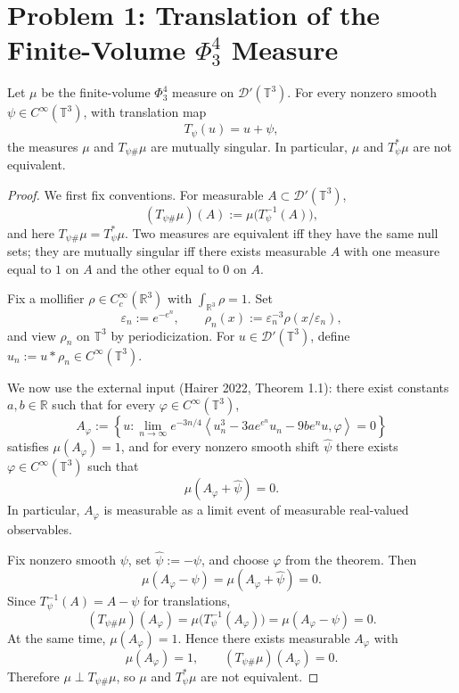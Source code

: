 \section{Problem 1: Translation of the Finite-Volume $\Phi^4_3$ Measure}\label{sec:q1}

\begin{proposition}
Let $\mu$ be the finite-volume $\Phi^4_3$ measure on $\mathcal D'(\mathbb T^3)$. For every nonzero smooth $\psi\in C^\infty(\mathbb T^3)$, with translation map
\[
T_\psi(u)=u+\psi,
\]
the measures $\mu$ and $T_{\psi\#}\mu$ are mutually singular. In particular, $\mu$ and $T_\psi^*\mu$ are not equivalent.
\end{proposition}

\begin{proof}
We first fix conventions. For measurable $A\subset\mathcal D'(\mathbb T^3)$,
\[
(T_{\psi\#}\mu)(A):=\mu\bigl(T_\psi^{-1}(A)\bigr),
\]
and here $T_{\psi\#}\mu=T_\psi^*\mu$. Two measures are equivalent iff they have the same null sets; they are mutually singular iff there exists measurable $A$ with one measure equal to $1$ on $A$ and the other equal to $0$ on $A$.

Fix a mollifier $\rho\in C_c^\infty(\mathbb R^3)$ with $\int_{\mathbb R^3}\rho=1$. Set
\[
\varepsilon_n:=e^{-e^n},\qquad \rho_n(x):=\varepsilon_n^{-3}\rho(x/\varepsilon_n),
\]
and view $\rho_n$ on $\mathbb T^3$ by periodicization. For $u\in\mathcal D'(\mathbb T^3)$, define $u_n:=u*\rho_n\in C^\infty(\mathbb T^3)$.

We now use the external input (Hairer 2022, Theorem 1.1): there exist constants $a,b\in\mathbb R$ such that for every $\varphi\in C^\infty(\mathbb T^3)$,
\[
A_\varphi
:=\left\{u:\lim_{n\to\infty}e^{-3n/4}\left\langle u_n^3-3ae^{e^n}u_n-9be^n u,\varphi\right\rangle=0\right\}
\]
satisfies $\mu(A_\varphi)=1$, and for every nonzero smooth shift $\widehat\psi$ there exists $\varphi\in C^\infty(\mathbb T^3)$ such that
\[
\mu(A_\varphi+\widehat\psi)=0.
\]
In particular, $A_\varphi$ is measurable as a limit event of measurable real-valued observables.

Fix nonzero smooth $\psi$, set $\widehat\psi:=-\psi$, and choose $\varphi$ from the theorem. Then
\[
\mu(A_\varphi-\psi)=\mu(A_\varphi+\widehat\psi)=0.
\]
Since $T_\psi^{-1}(A)=A-\psi$ for translations,
\[
(T_{\psi\#}\mu)(A_\varphi)=\mu\bigl(T_\psi^{-1}(A_\varphi)\bigr)=\mu(A_\varphi-\psi)=0.
\]
At the same time, $\mu(A_\varphi)=1$. Hence there exists measurable $A_\varphi$ with
\[
\mu(A_\varphi)=1,
\qquad
(T_{\psi\#}\mu)(A_\varphi)=0.
\]
Therefore $\mu\perp T_{\psi\#}\mu$, so $\mu$ and $T_\psi^*\mu$ are not equivalent.
\end{proof}

